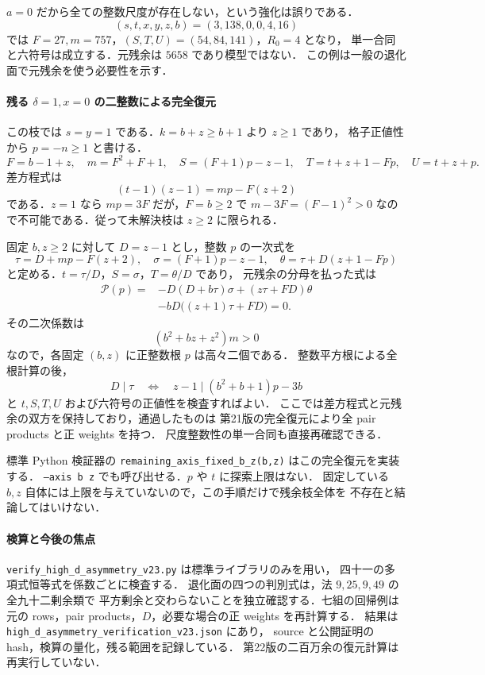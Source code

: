 $a=0$ だから全ての整数尺度が存在しない，という強化は誤りである．
\[
 (s,t,x,y,z,b)=(3,138,0,0,4,16)
\]
では $F=27,m=757$，$(S,T,U)=(54,84,141)$，$R_0=4$ となり，
単一合同と六符号は成立する．元残余は $5658$ であり模型ではない．
この例は一般の退化面で元残余を使う必要性を示す．

\paragraph{残る $\delta=1,x=0$ の二整数による完全復元}

この枝では $s=y=1$ である．$k=b+z\ge b+1$ より $z\ge1$ であり，
格子正値性から $p=-n\ge1$ と書ける．
\[
 F=b-1+z,\quad m=F^2+F+1,\quad
 S=(F+1)p-z-1,\quad T=t+z+1-Fp,\quad U=t+z+p.
\]
差方程式は
\[
 (t-1)(z-1)=mp-F(z+2)
\]
である．$z=1$ なら $mp=3F$ だが，$F=b\ge2$ で
$m-3F=(F-1)^2>0$ なので不可能である．従って未解決枝は $z\ge2$ に限られる．

固定 $b,z\ge2$ に対して $D=z-1$ とし，整数 $p$ の一次式を
\[
 \tau=D+mp-F(z+2),\quad
 \sigma=(F+1)p-z-1,\quad
 \theta=\tau+D(z+1-Fp)
\]
と定める．$t=\tau/D$，$S=\sigma$，$T=\theta/D$ であり，
元残余の分母を払った式は
\begin{equation}\label{notes:hd23-axis-quadratic}
 \begin{aligned}
 \mathcal P(p)={}&-D(D+b\tau)\sigma
 +(z\tau+FD)\theta\\
 &-bD\bigl((z+1)\tau+FD\bigr)=0.
 \end{aligned}
\end{equation}
その二次係数は
\[
 (b^2+bz+z^2)m>0
\]
なので，各固定 $(b,z)$ に正整数根 $p$ は高々二個である．
整数平方根による全根計算の後，
\[
 D\mid\tau\quad\Longleftrightarrow\quad
 z-1\mid(b^2+b+1)p-3b
\]
と $t,S,T,U$ および六符号の正値性を検査すればよい．
ここでは差方程式と元残余の双方を保持しており，通過したものは
第21版の完全復元により全 pair products と正 weights を持つ．
尺度整数性の単一合同も直接再確認できる．

標準 Python 検証器の \texttt{remaining\_axis\_fixed\_b\_z(b,z)} はこの完全復元を実装する．
\texttt{--axis b z} でも呼び出せる．$p$ や $t$ に探索上限はない．
固定している $b,z$ 自体には上限を与えていないので，この手順だけで残余枝全体を
不存在と結論してはいけない．

\paragraph{検算と今後の焦点}

\nolinkurl{verify_high_d_asymmetry_v23.py} は標準ライブラリのみを用い，
四十一の多項式恒等式を係数ごとに検査する．
退化面の四つの判別式は，法 $9,25,9,49$ の全九十二剰余類で
平方剰余と交わらないことを独立確認する．七組の回帰例は
元の rows，pair products，$D$，必要な場合の正 weights を再計算する．
結果は \nolinkurl{high_d_asymmetry_verification_v23.json} にあり，
source と公開証明の hash，検算の量化，残る範囲を記録している．
第22版の二百万余の復元計算は再実行していない．

